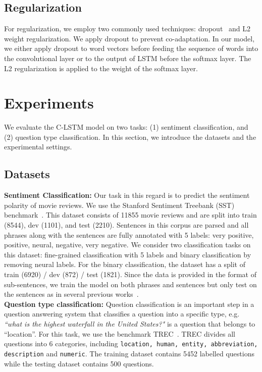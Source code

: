 \documentclass[11pt,letterpaper]{article}
\begin{document}
\subsection{Regularization}
For regularization, we employ two commonly used techniques:
dropout~\cite{dropout} and L2 weight regularization. We apply dropout to
prevent co-adaptation. In our model, we either apply dropout to word
vectors before feeding the sequence of words into the convolutional
layer or to the output of LSTM before the softmax layer. The L2
regularization is applied to the weight of the softmax layer.

\section{Experiments}
We evaluate the C-LSTM model on two tasks: (1) sentiment classification,
and (2) question type classification. In this section, we introduce the
datasets and the experimental settings.

\subsection{Datasets}
{\bf Sentiment Classification: } Our task in this regard is to
predict the sentiment polarity of movie reviews. We use the
Stanford Sentiment Treebank (SST) benchmark~\cite{socher2013}. This
dataset consists of 11855 movie reviews and are split into train (8544),
dev (1101), and test (2210). Sentences in this corpus are parsed and all
phrases along with the sentences are fully annotated with 5 labels: very
positive, positive, neural, negative, very negative. We consider two
classification tasks on this dataset: fine-grained classification with 5
labels and binary classification by removing neural labels. For the
binary classification, the dataset has a split of
train (6920) / dev (872) / test (1821). Since the data is provided in the
format of sub-sentences, we train the model on both phrases and sentences but
only test on the sentences as in several previous
works~\cite{socher2013,dcnn}.\\
{\bf Question type classification: }Question classification is an
important step in a question answering system that classifies a question
into a specific type, e.g. \textit{``what is the highest waterfall in
the United States?"} is a question that belongs to ``location''. For
this task, we use the benchmark TREC~\cite{trec}. TREC divides all
questions into 6 categories, including \texttt{location, human, entity,
abbreviation, description} and \texttt{numeric}. The training dataset
contains 5452 labelled questions while the testing dataset contains 500
questions.
\end{document}
